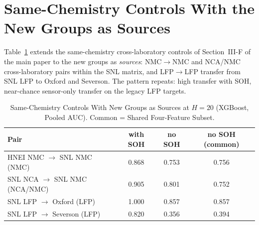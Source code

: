 \documentclass[journal]{IEEEtran}
\begin{document}
\section{Same-Chemistry Controls With the New Groups as Sources}
Table~\ref{tab:s_samechem_ba} extends the same-chemistry cross-laboratory controls of Section~III-F of the main paper to the new groups as \emph{sources}: NMC$\to$NMC and NCA/NMC cross-laboratory pairs within the SNL matrix, and LFP$\to$LFP transfer from SNL LFP to Oxford and Severson. The pattern repeats: high transfer with SOH, near-chance sensor-only transfer on the legacy LFP targets.
\begin{table}[!t]
\caption{Same-Chemistry Controls With New Groups as Sources at $H{=}20$ (XGBoost, Pooled AUC). Common = Shared Four-Feature Subset.}
\label{tab:s_samechem_ba}
\centering\footnotesize\setlength{\tabcolsep}{3pt}
\begin{tabular}{lccc}
\toprule
\textbf{Pair} & \textbf{with SOH} & \textbf{no SOH} & \textbf{no SOH (common)}\\
\midrule
HNEI NMC $\to$ SNL NMC (NMC) & 0.868 & 0.753 & 0.756\\
SNL NCA $\to$ SNL NMC (NCA/NMC) & 0.905 & 0.801 & 0.752\\
SNL LFP $\to$ Oxford (LFP) & 1.000 & 0.857 & 0.857\\
SNL LFP $\to$ Severson (LFP) & 0.820 & 0.356 & 0.394\\
\bottomrule
\end{tabular}
\end{table}
\end{document}
